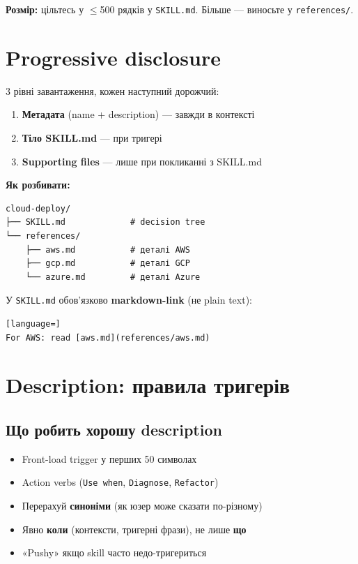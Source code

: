 \documentclass[11pt,a4paper]{article}
\begin{document}
\textbf{Розмір:} цільтесь у $\le$500 рядків у \texttt{SKILL.md}. Більше --- виносьте у \texttt{references/}.

\section{Progressive disclosure}

3 рівні завантаження, кожен наступний дорожчий:

\begin{enumerate}
\item \textbf{Метадата} (name + description) — завжди в контексті
\item \textbf{Тіло SKILL.md} — при тригері
\item \textbf{Supporting files} — лише при покликанні з SKILL.md
\end{enumerate}

\textbf{Як розбивати:}

\begin{lstlisting}
cloud-deploy/
├── SKILL.md             # decision tree
└── references/
    ├── aws.md           # деталі AWS
    ├── gcp.md           # деталі GCP
    └── azure.md         # деталі Azure
\end{lstlisting}

У \texttt{SKILL.md} обов'язково \textbf{markdown-link} (не plain text):

\begin{lstlisting}[language=]
For AWS: read [aws.md](references/aws.md)
\end{lstlisting}

\section{Description: правила тригерів}

\subsection{Що робить хорошу description}

\begin{itemize}
\item Front-load trigger у перших 50 символах
\item Action verbs (\texttt{Use when}, \texttt{Diagnose}, \texttt{Refactor})
\item Перерахуй \textbf{синоніми} (як юзер може сказати по-різному)
\item Явно \textbf{коли} (контексти, тригерні фрази), не лише \textbf{що}
\item «Pushy» якщо skill часто недо-тригериться
\end{itemize}
\end{document}
